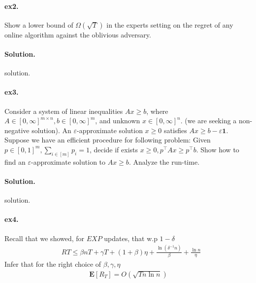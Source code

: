 \documentclass{article}
\newcommand{\expp}[1]{ \mathbf{E} \left[ {#1} \right]}
\begin{document}
\begin{multicols*}{2}
  \paragraph{ex2.} Show a lower bound of $\Omega\left( \sqrt{T} \right)$ in the experts setting on the regret of any online algorithm against the oblivious adversary. 

  \paragraph{Solution.} solution. 
  \paragraph{ex3.}Consider a system of linear inequalities $Ax \ge b$, where $A\in [0, \infty]^{m\times n} , b \in  [0, \infty]^{m}$, and unknown $x \in  [0, \infty]^{ n}$. (we are seeking a non-negative solution). An $\varepsilon$-approximate solution $x\ge 0$ satisfies $Ax\ge b - \varepsilon \mathbf{1}$. Suppose we have an efficient procedure for following problem: Given $p \in [0,1]^{m}, \sum_{i \in [m]}{p_{i}} = 1$, decide if exists $x \ge 0, p^{\top}Ax \ge p^{\top}b$. Show how to find an $\varepsilon$-approximate solution to $Ax \ge b$. Analyze the run-time. 
  \paragraph{Solution.} solution. 
  \paragraph{ex4.} Recall that we showed, for $EXP$ updates, that w.p $1 - \delta$ 
  \begin{equation*}
    \begin{split}
      &  R{T} \le \beta n T + \gamma T + \left( 1 + \beta \right)\eta + \frac{\ln\left( \delta^{-1} n \right) }{\beta} + \frac{\ln n}{\eta}  
    \end{split}
  \end{equation*}
  Infer that for the right choice of $\beta,\gamma, \eta$ 
  \begin{equation*}
    \begin{split}
      \expp{R_{T}} = O\left( \sqrt{T n \ln n } \right)
    \end{split}
  \end{equation*}
\end{multicols*}
  \printbibliography 
\end{document}
